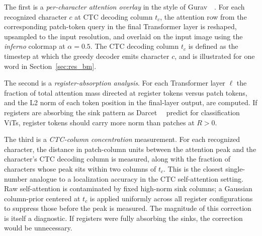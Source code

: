 The first is a \emph{per-character attention overlay} in the style of Gurav~\etal~\cite{gurav2025beyondmem}. For each recognized character $c$ at CTC decoding column $t_c$, the attention row from the corresponding patch-token query in the final Transformer layer is reshaped, upsampled to the input resolution, and overlaid on the input image using the \emph{inferno} colormap at $\alpha = 0.5$. The CTC decoding column $t_c$ is defined as the timestep at which the greedy decoder emits character $c$, and is illustrated for one word in Section~\ref{sec:res_bm}.

The second is a \emph{register-absorption analysis}. For each Transformer layer $\ell$ the fraction of total attention mass directed at register tokens versus patch tokens, and the L2 norm of each token position in the final-layer output, are computed. If registers are absorbing the sink pattern as Darcet~\etal~\cite{darcet2024registers} predict for classification ViTs, register tokens should carry more norm than patches at $R > 0$.

The third is a \emph{CTC-column concentration} measurement. For each recognized character, the distance in patch-column units between the attention peak and the character's CTC decoding column is measured, along with the fraction of characters whose peak sits within two columns of $t_c$. This is the closest single-number analogue to a localization accuracy in the CTC self-attention setting. Raw self-attention is contaminated by fixed high-norm sink columns; a Gaussian column-prior centered at $t_c$ is applied uniformly across all register configurations to suppress those before the peak is measured. The magnitude of this correction is itself a diagnostic. If registers were fully absorbing the sinks, the correction would be unnecessary.
